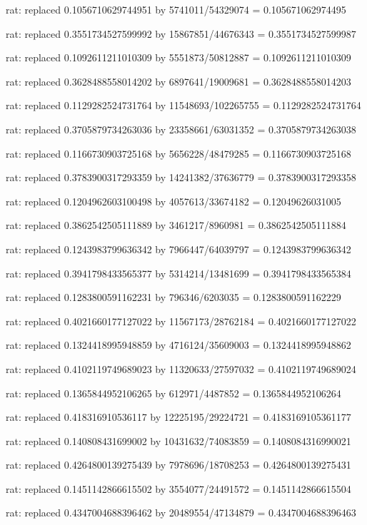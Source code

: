 \documentclass[a4paper,10pt]{article}
\begin{document}
\begin{eulernotebook}
\begin{eulercomment}
\begin{eulercomment}
\begin{eulercomment}
\begin{eulercomment}
\begin{eulercomment}
\begin{eulercomment}
\begin{eulercomment}
\begin{eulercomment}
\begin{eulercomment}
\begin{eulercomment}
\begin{eulercomment}
\begin{eulercomment}
\begin{eulercomment}
\begin{eulercomment}
\begin{eulercomment}
\begin{eulercomment}
\begin{euleroutput}
  rat: replaced 0.1056710629744951 by 5741011/54329074 = 0.105671062974495
  
  rat: replaced 0.3551734527599992 by 15867851/44676343 = 0.3551734527599987
  
  rat: replaced 0.1092611211010309 by 5551873/50812887 = 0.1092611211010309
  
  rat: replaced 0.3628488558014202 by 6897641/19009681 = 0.3628488558014203
  
  rat: replaced 0.1129282524731764 by 11548693/102265755 = 0.1129282524731764
  
  rat: replaced 0.3705879734263036 by 23358661/63031352 = 0.3705879734263038
  
  rat: replaced 0.1166730903725168 by 5656228/48479285 = 0.1166730903725168
  
  rat: replaced 0.3783900317293359 by 14241382/37636779 = 0.3783900317293358
  
  rat: replaced 0.1204962603100498 by 4057613/33674182 = 0.12049626031005
  
  rat: replaced 0.3862542505111889 by 3461217/8960981 = 0.3862542505111884
  
  rat: replaced 0.1243983799636342 by 7966447/64039797 = 0.1243983799636342
  
  rat: replaced 0.3941798433565377 by 5314214/13481699 = 0.3941798433565384
  
  rat: replaced 0.1283800591162231 by 796346/6203035 = 0.1283800591162229
  
  rat: replaced 0.4021660177127022 by 11567173/28762184 = 0.4021660177127022
  
  rat: replaced 0.1324418995948859 by 4716124/35609003 = 0.1324418995948862
  
  rat: replaced 0.4102119749689023 by 11320633/27597032 = 0.4102119749689024
  
  rat: replaced 0.1365844952106265 by 612971/4487852 = 0.1365844952106264
  
  rat: replaced 0.418316910536117 by 12225195/29224721 = 0.4183169105361177
  
  rat: replaced 0.140808431699002 by 10431632/74083859 = 0.1408084316990021
  
  rat: replaced 0.4264800139275439 by 7978696/18708253 = 0.4264800139275431
  
  rat: replaced 0.1451142866615502 by 3554077/24491572 = 0.1451142866615504
  
  rat: replaced 0.4347004688396462 by 20489554/47134879 = 0.4347004688396463
  

\end{euleroutput}
\end{eulercomment}
\end{eulercomment}
\end{eulercomment}
\end{eulercomment}
\end{eulercomment}
\end{eulercomment}
\end{eulercomment}
\end{eulercomment}
\end{eulercomment}
\end{eulercomment}
\end{eulercomment}
\end{eulercomment}
\end{eulercomment}
\end{eulercomment}
\end{eulercomment}
\end{eulercomment}
\end{eulernotebook}
\end{document}
